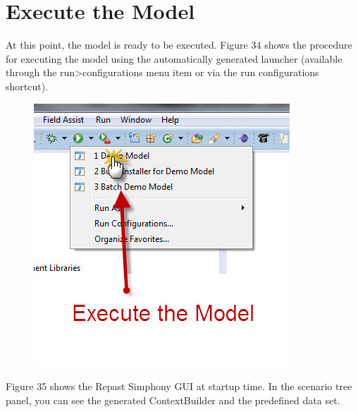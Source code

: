 \documentclass[11pt]{amsart}
\begin{document}
\newpage

\section{Execute the Model}
At this point, the model is ready to be executed. Figure 34 shows the procedure for executing the model using the automatically generated launcher (available through the run>configurations menu item or via the run configurations shortcut).


\begin{figure}[ht]
\begin{center}
\vspace{.2in}
\centerline {
\includegraphics[totalheight=0.3\textheight]{images/034.jpg}
}
\caption{}
\label{fig:034}
\end{center}
\end{figure}


Figure 35 shows the Repast Simphony GUI at startup time. In the scenario tree panel, you can see the generated ContextBuilder and the predefined data set. 
\end{document}
